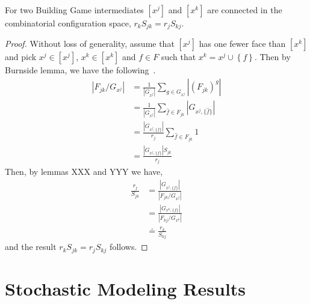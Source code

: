 \begin{mythm}
\label{thm:J}
For two Building Game intermediates $[x^j]$ and $[x^k]$ are connected in the combinatorial configuration space, $r_kS_{jk} = r_jS_{kj}$.
\end{mythm}
\begin{proof}
Without loss of generality, assume that $[x^j]$ has one fewer face than $[x^k]$ and pick $x^j \in [x^j]$, $x^k \in [x^k]$ and $f \in F$ such that $x^k = x^j \cup \left\{f\right\}$. Then by Burnside lemma, we have the following~\cite{Rotman1995}. 
\begin{align}
\left|F_{jk} / G_{x^j}\right| &= \frac{1}{|G_{x^j}|}\sum_{g \in G_{x^j}}|(F_{jk})^g| \\
&= \frac{1}{|G_{x^j}|}\sum_{\hat{f} \in F_{jk}}|G_{x^j,\{\hat{f}\}}| \\
&= \frac{|G_{x^j,\{f\}}|}{r_j}\sum_{\hat{f} \in F_{jk}}1 \\
&= \frac{|G_{x^j,\{f\}}|S_{jk}}{r_j}
\end{align}
Then, by lemmas XXX and YYY we have,
\begin{align}
\frac{r_j}{S_{jk}} &= \frac{|G_{x^j,\{f\}}|}{\left|F_{jk} / G_{x^j}\right|} \\
&= \frac{|G_{x^k,\{f\}}|}{\left|F_{kj} / G_{x^k}\right|} \\
&\doteq \frac{r_k}{S_{kj}} 
\end{align}
and the result $r_kS_{jk} = r_jS_{kj}$ follows.
\end{proof}


\section{Stochastic Modeling Results}


